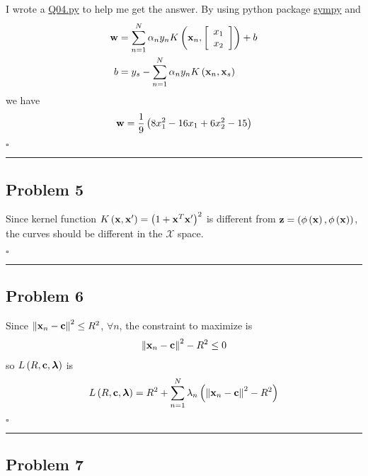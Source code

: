 \documentclass[12pt]{article}
\newcommand*{\QEDB}{\hfill\ensuremath{\square}}
\newcommand{\SBrackets}[1]{\left[#1\right]}
\newcommand{\ParTh}[1]{\left(#1\right)}
\newcommand{\BF}[1]{{\bf#1}}
\newcommand{\VecAbsVal}[1]{\left\|#1\right\|}
\newcommand{\Matrix}[2]{\SBrackets{\begin{array}{#1}#2\end{array}}}
\newcommand{\horrule}[1]{\rule{\linewidth}{#1}}
\begin{document}
I wrote a \url{Q04.py} to help me get the answer. By using python package \url{sympy} and
\begin{align}
\BF{w}&=\sum_{n=1}^{N}\alpha_ny_nK\ParTh{\BF{x}_n,\Matrix{c}{x_1\\x_2}}+b\\
b&=y_s-\sum_{n=1}^{N}\alpha_ny_nK\ParTh{\BF{x}_n,\BF{x}_s}
\end{align}
we have
\begin{align}
\BF{w}=\dfrac{1}{9}\ParTh{8x^2_1 - 16x_1 + 6x^2_2-15}
\end{align}

\QEDB

\horrule{0.5pt}

\subsection*{Problem 5}

Since kernel function $K\ParTh{\BF{x},\BF{x}^\prime}=\ParTh{1+\BF{x}^T\BF{x}^\prime}^2$ is different from $\BF{z}=\ParTh{\phi\ParTh{\BF{x}},\phi\ParTh{\BF{x}}}$, the curves should be different in the $\mathcal{X}$ space.

\QEDB

\horrule{0.5pt}

\subsection*{Problem 6}

Since $\VecAbsVal{\BF{x}_n-\BF{c}}^2\leq R^2$, $\forall n$, the constraint to maximize is
\begin{align}
\VecAbsVal{\BF{x}_n-\BF{c}}^2-R^2\leq0
\end{align}
so $L\ParTh{R,\BF{c},\bm{\lambda}}$ is
\begin{align}
L\ParTh{R,\BF{c},\bm{\lambda}}=R^2+\sum_{n=1}^{N}\lambda_n\ParTh{\VecAbsVal{\BF{x}_n-\BF{c}}^2-R^2}
\end{align}

\QEDB

\horrule{0.5pt}

\subsection*{Problem 7}
\end{document}
